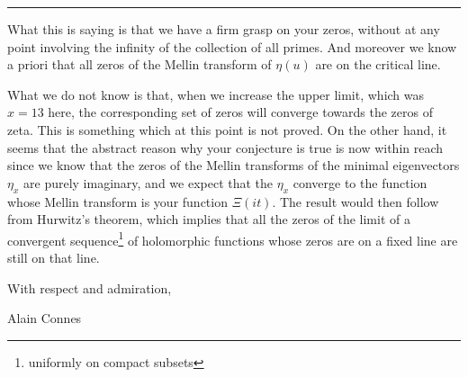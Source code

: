 \documentclass{article}
\begin{document}
\begin{center}
\rule{.95\textwidth}{0.4pt}
\end{center}\vspace{0.1cm}
\begin{large}
 What this is saying is that we have a firm grasp on your zeros, without at any point involving the infinity of the collection of all primes. And moreover we know a priori that  all zeros of the Mellin transform of $\eta(u)$ are on the critical line.
 
     
 \medskip
 

 What we do not know is that, when we increase the upper limit, which was  $x=13$ here, the corresponding set of zeros will converge towards the  zeros of zeta. This is something which at this point is not proved. On the other hand, it seems that the abstract reason why your conjecture is true is now within reach since we know that the zeros of the Mellin transforms of the minimal eigenvectors $\eta_x$ are purely imaginary, and we expect that the $\eta_x$ converge to the function whose Mellin transform is your function $\Xi(it)$. The result would then follow from Hurwitz's theorem, which implies that all the zeros of the limit of a convergent sequence\footnote{uniformly on compact subsets} of holomorphic functions whose zeros are on a fixed line are still on that line.
 
 \vspace{.1in}

\centerline{With respect and admiration, }

\vspace{.1in}

\centerline{Alain Connes}

\end{large}

\endgroup
 
 \newpage
 
\end{document}
